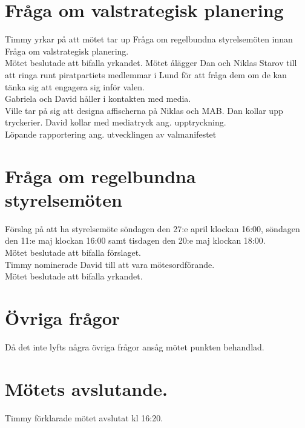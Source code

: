 \documentclass[a4paper,10pt]{article}
\begin{document}
\section{Fråga om valstrategisk planering}
Timmy yrkar på att mötet tar up Fråga om regelbundna styrelsemöten innan Fråga om valstrategisk planering.\\
Mötet beslutade att bifalla yrkandet.
Mötet ålägger Dan och Niklas Starov till att ringa runt piratpartiets medlemmar i Lund för att fråga dem om de kan tänka sig att engagera sig inför valen.\\
Gabriela och David håller i kontakten med media.\\
Ville tar på sig att designa affischerna på Niklas och MAB. Dan kollar upp tryckerier. David kollar med mediatryck ang. upptryckning.\\
Löpande rapportering ang. utvecklingen av valmanifestet 

\section{Fråga om regelbundna styrelsemöten}
Förslag på att ha styrelsemöte söndagen den 27:e april klockan 16:00, söndagen den 11:e maj klockan 16:00 samt tisdagen den 20:e maj klockan 18:00.\\
Mötet beslutade att bifalla förslaget.\\
Timmy nominerade David till att vara mötesordförande.\\
Mötet beslutade att bifalla yrkandet.

\section{Övriga frågor}
Då det inte lyfts några övriga frågor ansåg mötet punkten behandlad.

\section{Mötets avslutande.}
Timmy förklarade mötet avslutat kl 16:20.
\end{document}
